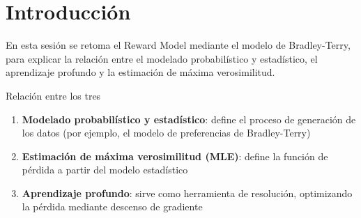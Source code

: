 \section{Introducción}
En esta sesión se retoma el Reward Model mediante el modelo de Bradley-Terry, para explicar la relación entre el modelado probabilístico y estadístico, el aprendizaje profundo y la estimación de máxima verosimilitud.

\begin{importantbox}{Relación entre los tres}
\begin{enumerate}
  \item \textbf{Modelado probabilístico y estadístico}: define el proceso de generación de los datos (por ejemplo, el modelo de preferencias de Bradley-Terry)
  \item \textbf{Estimación de máxima verosimilitud (MLE)}: define la función de pérdida a partir del modelo estadístico
  \item \textbf{Aprendizaje profundo}: sirve como herramienta de resolución, optimizando la pérdida mediante descenso de gradiente
\end{enumerate}
\end{importantbox}

